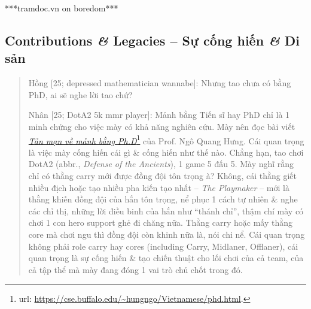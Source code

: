 \documentclass[12pt]{article}
\begin{document}
***tramdoc.vn on boredom***


\subsection{Contributions {\it\&} Legacies -- Sự cống hiến {\it\&} Di sản}

\begin{quote}
	{\sf Hồng [25; depressed mathematician wannabe]}: Nhưng tao chưa có bằng PhD, ai sẽ nghe lời tao chứ?
	
	{\sf Nhân [25; DotA2 5k mmr player]}: Mảnh bằng Tiến sĩ hay PhD chỉ là 1 minh chứng cho việc mày có khả năng nghiên cứu. Mày nên đọc bài viết \href{https://cse.buffalo.edu/~hungngo/Vietnamese/phd.html}{\it Tản mạn về mảnh bằng Ph.D}\footnote{{\sc url}: \url{https://cse.buffalo.edu/~hungngo/Vietnamese/phd.html}.} của Prof. {\sc Ngô Quang Hưng}. Cái quan trọng là việc mày cống hiến cái gì \& cống hiến như thế nào. Chẳng hạn, tao chơi DotA2 (abbr., {\it Defense of the Ancients}), 1 game 5 đấu 5. Mày nghĩ rằng chỉ có thằng carry mới được đồng đội tôn trọng à? Không, cái thằng giết nhiều địch hoặc tạo nhiều pha kiến tạo nhất -- {\it The Playmaker} -- mới là thằng khiến đồng đội của hắn tôn trọng, nể phục 1 cách tự nhiên \& nghe các chỉ thị, những lời điều binh của hắn như ``thánh chỉ'', thậm chí mày có chơi 1 con hero support ghẻ đi chăng nữa. Thằng carry hoặc mấy thằng core mà chơi ngu thì đồng đội còn khinh nữa là, nói chi nể. Cái quan trọng không phải role carry hay cores (including Carry, Midlaner, Offlaner), cái quan trọng là sự cống hiến \& tạo chiến thuật cho lối chơi của cả team, của cả tập thể mà mày đang đóng 1 vai trò chủ chốt trong đó.
\end{quote}
\end{document}
